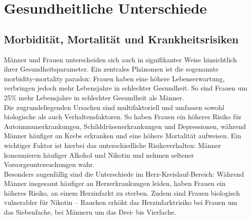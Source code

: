 \documentclass[12pt,a4paper]{article}
\begin{document}
	\section{Gesundheitliche Unterschiede}
	\subsection{Morbidität, Mortalität und Krankheitsrisiken}
	Männer und Frauen unterscheiden sich auch in signifikanter Weise hinsichtlich ihrer Gesundheitsparameter. Ein zentrales Phänomen ist die sogenannte \glqq morbidity-mortality paradox\grqq: Frauen haben eine höhere Lebenserwartung, verbringen jedoch mehr Lebensjahre in schlechter Gesundheit. \cite{OECD2025} So sind Frauen um 25\% mehr Lebensjahre in schlechter Gesundheit als Männer. \cite{BerlinScienceSurvey}\\
	Die zugrundeliegenden Ursachen sind multifaktoriell und umfassen sowohl biologische als auch Verhaltensfaktoren. So haben Frauen ein höheres Risiko für Autoimmunerkrankungen, Schilddrüsenerkrankungen und Depressionen, während Männer häufiger an Krebs erkranken und eine höhere Mortalität aufweisen. \cite{NatureDiseases2024} Ein wichtiger Faktor ist hierbei das unterschiedliche Risikoverhalten: Männer konsumieren häufiger Alkohol und Nikotin und nehmen seltener Vorsorgeuntersuchungen wahr. \cite{Hasenburg2025}\\
	Besonders augenfällig sind die Unterschiede im Herz-Kreislauf-Bereich: Während Männer insgesamt häufiger an Herzerkrankungen leiden, haben Frauen ein höheres Risiko, an einem Herzinfarkt zu sterben. Zudem sind Frauen biologisch vulnerabler für Nikotin -- Rauchen erhöht das Herzinfarktrisiko bei Frauen um das Siebenfache, bei Männern um das Drei- bis Vierfache. \cite{IASGruppe}
	
\end{document}
